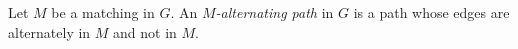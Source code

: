 

\setcounter{section}{4}
\setcounter{subsection}{2}
\setcounter{dfn}{2}

\begin{dfn}
Let $M$ be a matching in $G$.
An \emph{$M$-alternating path} in $G$ is a path whose edges are alternately in $M$ and not in $M$.
\end{dfn}


